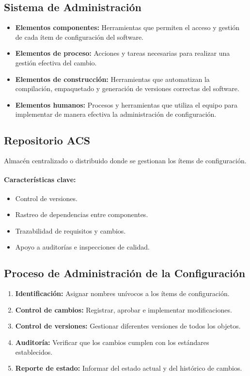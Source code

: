 \subsection{Sistema de Administración}\label{subsec:sistema-de-administracion}
\begin{itemize}
    \item \textbf{Elementos componentes:} Herramientas que permiten el acceso y gestión de cada ítem de configuración del software.
    \item \textbf{Elementos de proceso:} Acciones y tareas necesarias para realizar una gestión efectiva del cambio.
    \item \textbf{Elementos de construcción:} Herramientas que automatizan la compilación, empaquetado y generación de versiones correctas del software.
    \item \textbf{Elementos humanos:} Procesos y herramientas que utiliza el equipo para implementar de manera efectiva la administración de configuración.
\end{itemize}

\subsection{Repositorio ACS}\label{subsec:repositorio-acs}
\begin{definicion}
    Almacén centralizado o distribuido donde se gestionan los ítems de configuración.
\end{definicion}

\paragraph{Características clave:}
\begin{itemize}
    \item Control de versiones.
    \item Rastreo de dependencias entre componentes.
    \item Trazabilidad de requisitos y cambios.
    \item Apoyo a auditorías e inspecciones de calidad.
\end{itemize}

\subsection{Proceso de Administración de la Configuración}\label{subsec:proceso-de-administracion-de-la-configuracion}
\begin{enumerate}
    \item \textbf{Identificación:} Asignar nombres unívocos a los ítems de configuración.
    \item \textbf{Control de cambios:} Registrar, aprobar e implementar modificaciones.
    \item \textbf{Control de versiones:} Gestionar diferentes versiones de todos los objetos.
    \item \textbf{Auditoría:} Verificar que los cambios cumplen con los estándares establecidos.
    \item \textbf{Reporte de estado:} Informar del estado actual y del histórico de cambios.
\end{enumerate}

